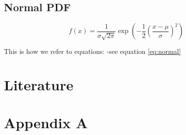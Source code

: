\documentclass[
]{book}
\begin{document}
\hypertarget{normal-pdf}{%
\section{Normal PDF}\label{normal-pdf}}

\begin{equation} 
f(x) = \frac{1}{\sigma\sqrt{2\pi}}\exp\left(-\frac{1}{2}\left(\frac{x-\mu}{\sigma}\right)^{2}\right)
\label{eq:normal}
\end{equation}

This is how we refer to equations:
-see equation \eqref{eq:normal}

\hypertarget{literature}{%
\chapter*{Literature}\label{literature}}

\hypertarget{appendix-appendix}{%
\appendix}


\hypertarget{appendix-a}{%
\chapter*{Appendix A}\label{appendix-a}}

  
\end{document}
